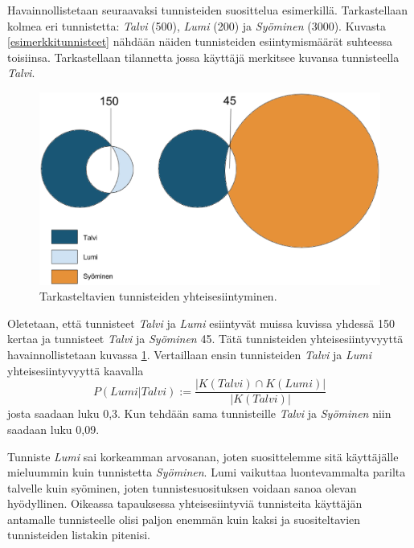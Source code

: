 \documentclass[12pt,finnish]{tktltiki2}
\theoremstyle{definition}
\theoremstyle{remark}
\begin{document}
Havainnollistetaan seuraavaksi tunnisteiden suosittelua esimerkillä. Tarkastellaan kolmea eri tunnistetta: \textit{Talvi} (500), \textit{Lumi} (200) ja \textit{Syöminen} (3000). Kuvasta \ref{esimerkkitunnisteet} nähdään näiden tunnisteiden esiintymismäärät suhteessa toisiinsa. Tarkastellaan tilannetta jossa käyttäjä merkitsee kuvansa tunnisteella \textit{Talvi}.
\begin{figure}[h]
\centerline{\includegraphics[width = 360pt]{uudetvennit.eps}}\caption{Tarkasteltavien tunnisteiden yhteisesiintyminen.}
\label{vennit}
\end{figure}
Oletetaan, että tunnisteet \textit{Talvi} ja \textit{Lumi} esiintyvät muissa kuvissa yhdessä 150 kertaa ja tunnisteet \textit{Talvi} ja \textit{Syöminen} 45. Tätä tunnisteiden yhteisesiintyvyyttä havainnollistetaan kuvassa \ref{vennit}. Vertaillaan ensin tunnisteiden \textit{Talvi} ja \textit{Lumi} yhteisesiintyvyyttä kaavalla 
\begin{displaymath} 
P (Lumi | Talvi):= \frac{|K(Talvi) \cap K(Lumi)|} {|K(Talvi)|}
\end{displaymath}
josta saadaan luku 0,3.
Kun tehdään sama tunnisteille \textit{Talvi} ja \textit{Syöminen} niin saadaan luku 0,09. 

Tunniste \textit{Lumi} sai korkeamman arvosanan, joten suosittelemme sitä käyttäjälle mieluummin kuin tunnistetta \textit{Syöminen}. Lumi vaikuttaa luontevammalta parilta talvelle kuin syöminen, joten tunnistesuosituksen voidaan sanoa olevan hyödyllinen. Oikeassa tapauksessa yhteisesiintyviä tunnisteita käyttäjän antamalle tunnisteelle olisi paljon enemmän kuin kaksi ja suositeltavien tunnisteiden listakin pitenisi.
\end{document}
